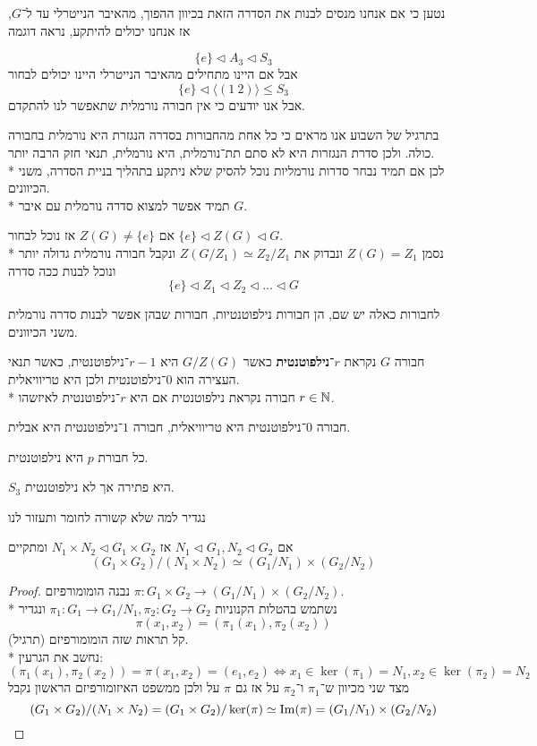 נטען כי אם אנחנו מנסים לבנות את הסדרה הזאת בכיוון ההפוך, מהאיבר הנייטרלי עד ל־$G$, אז אנחנו יכולים להיתקע, נראה דוגמה
\begin{example}
	\[
		\{ e \} \triangleleft A_3 \triangleleft S_3
	\]
	אבל אם היינו מתחילים מהאיבר הנייטרלי היינו יכולים לבחור
	\[
		\{e\} \triangleleft \langle (1\ 2) \rangle \le S_3
	\]
	אבל אנו יודעים כי אין חבורה נורמלית שתאפשר לנו להתקדם.
\end{example}
בתרגיל של השבוע אנו מראים כי כל אחת מהחבורות בסדרה הנגזרת היא נורמלית בחבורה כולה.
ולכן סדרת הנגזרות היא לא סתם תת־נורמלית, היא נורמלית, תנאי חזק הרבה יותר. \\*
לכן אם תמיד נבחר סדרות נורמליות נוכל להסיק שלא ניתקע בתהליך בניית הסדרה, משני הכיוונים. \\*
תמיד אפשר למצוא סדרה נורמלית עם איבר $G$.
\begin{example}
	אם $Z(G) \ne \{ e \}$ אז נוכל לבחור $\{e\} \triangleleft Z(G) \triangleleft G$. \\*
	נסמן $Z(G) = Z_1$ ונבדוק את $Z(G / Z_1) \simeq Z_2 / Z_1$ ונקבל חבורה נורמלית גדולה יותר ונוכל לבנות ככה סדרה
	\[
		\{e\} \triangleleft Z_1 \triangleleft Z_2 \triangleleft \dots \triangleleft G
	\]
\end{example}
לחבורות כאלה יש שם, הן חבורות נילפוטנטיות, חבורות שבהן אפשר לבנות סדרה נורמלית משני הכיוונים.
\begin{definition}
	חבורה $G$ נקראת \textbf{$r$־נילפוטנטית} כאשר $G / Z(G)$ היא $r - 1$־נילפוטנטית, כאשר תנאי העצירה הוא $0$־נילפוטנטית ולכן היא טריוויאלית. \\*
	חבורה נקראת נילפוטנטית אם היא $r$־נילפוטנטית לאיזשהו $r \in \mathbb{N}$.
\end{definition}
\begin{remark}
	חבורה $0$־נילפוטנטית היא טריוויאלית, חבורה $1$־נילפוטנטית היא אבלית.
\end{remark}
\begin{example}
	כל חבורת $p$ היא נילפוטנטית.
\end{example}
\begin{example}
	$S_3$ היא פתירה אך לא נילפוטנטית.
\end{example}
נגדיר למה שלא קשורה לחומר ותעזור לנו
\begin{lemma}
	אם $N_1 \triangleleft G_1, N_2 \triangleleft G_2$ אז $N_1 \times N_2 \triangleleft G_1 \times G_2$ ומתקיים
	\[
		(G_1 \times G_2) / (N_1 \times N_2) \simeq (G_1 / N_1) \times (G_2 / N_2)
	\]
\end{lemma}
\begin{proof}
	נבנה הומומורפיזם $\pi : G_1 \times G_2 \to (G_1 / N_1) \times (G_2 / N_2)$. \\*
	נשתמש בהטלות הקנוניות $\pi_1 : G_1 \to G_1 / N_1, \pi_2 : G_2 \to G_2$ ונגדיר
	\[
		\pi(x_1, x_2) = ( \pi_1(x_1), \pi_2(x_2) )
	\]
	קל תראות שזה הומומורפיזם (תרגיל). \\*
	נחשב את הגרעין:
	\[
		( \pi_1(x_1), \pi_2(x_2) ) = \pi(x_1, x_2) = (e_1, e_2)
		\iff
		x_1 \in \ker(\pi_1) = N_1,
		x_2 \in \ker(\pi_2) = N_2
	\]
	מצד שני מכיוון ש־$\pi_1$ ו־$\pi_2$ על אז גם $\pi$ על ולכן ממשפט האיזומורפיזם הראשון נקבל
	\[
		(G_1 \times G_2) / (N_1 \times N_2) = (G_1 \times G_2) / \ker(\pi) \simeq \operatorname{Im}(\pi) = (G_1 / N_1) \times (G_2 / N_2)
	\]
\end{proof}
